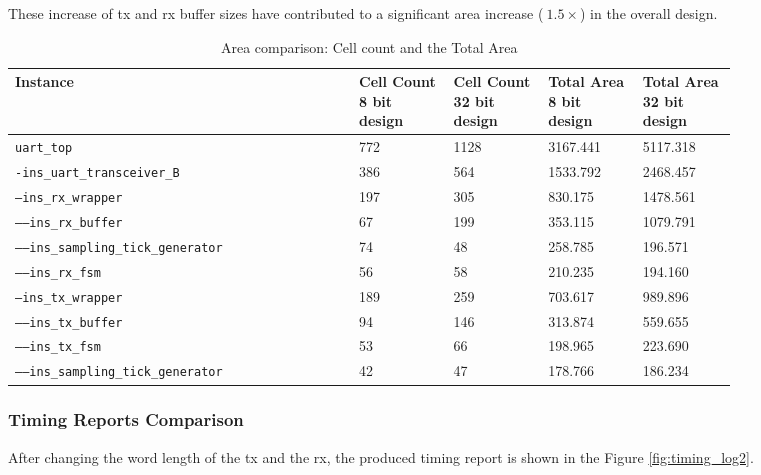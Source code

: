 \documentclass[a4paper,11pt]{article}%
\begin{document}
These increase of \ac{tx} and \ac{rx} buffer sizes have contributed to a significant area increase ($~1.5\times$) in the overall design.

\begin{table}[h]
	\centering
	\caption{Area comparison: Cell count and the Total Area}
	\begin{tabular}{|L{0.4\linewidth}  |C{0.11\linewidth}  | C{0.11\linewidth}  |C{0.11\linewidth}  | C{0.11\linewidth} |} \hline
		Instance & Cell Count 8 bit design & Cell Count 32 bit design & Total Area 8 bit design & Total Area 32 bit design\\ \hline
{\tt uart\_top} & 772 & 1128 & 3167.441 & 5117.318\\ \hline
{\tt -ins\_uart\_transceiver\_B} & 386 &  564 & 1533.792 & 2468.457\\ \hline
{\tt ---ins\_rx\_wrapper} & 197 &  305 &  830.175 & 1478.561\\ \hline
{\tt -----ins\_rx\_buffer} &  67 &  199 &  353.115 & 1079.791\\ \hline
{\tt -----ins\_sampling\_tick\_generator} &  74 &   48 &  258.785 &  196.571\\ \hline
{\tt -----ins\_rx\_fsm} &  56 &   58 &  210.235 &  194.160\\ \hline
{\tt ---ins\_tx\_wrapper} & 189 &  259 &  703.617 &  989.896\\ \hline
{\tt -----ins\_tx\_buffer} &  94 &  146 &  313.874 &  559.655\\ \hline
{\tt -----ins\_tx\_fsm} &  53 &   66 &  198.965 &  223.690\\ \hline
{\tt -----ins\_sampling\_tick\_generator} &  42 &   47 &  178.766 &  186.234\\ \hline		
	\end{tabular}
	\label{table:area_compare}
\end{table}

\subsubsection{Timing Reports Comparison}

After changing the word length of the \ac{tx} and the \ac{rx}, the produced timing report is shown in the Figure \ref{fig:timing_log2}.
\end{document}
